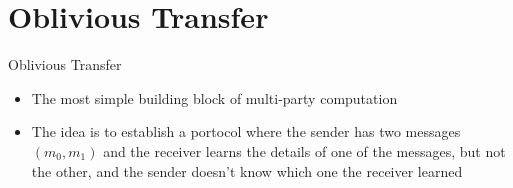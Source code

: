 \documentclass[handout]{beamer}
\begin{document}
\section{Oblivious Transfer}

\begin{frame}{Oblivious Transfer}
  \begin{itemize}
    \item \pause The most simple building block of multi-party computation
    \item \pause The idea is to establish a portocol where the sender has two messages \((m_0, m_1)\) and the receiver learns the details of one of the messages, but not the other, and the sender doesn't know which one the receiver learned
  \end{itemize}
\end{frame}
\end{document}
